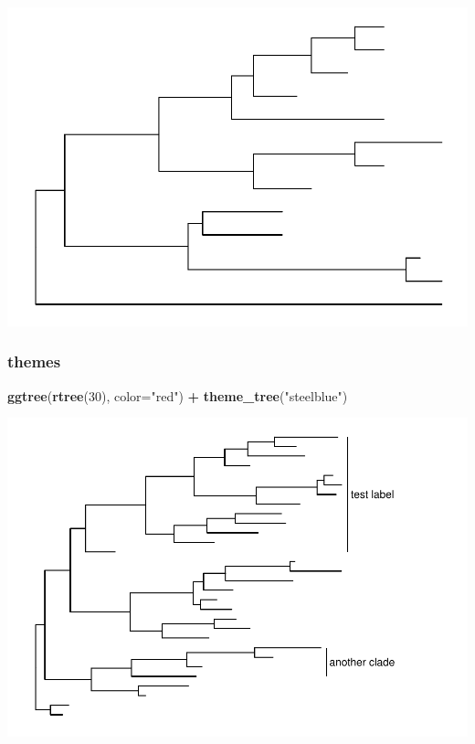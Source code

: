 \documentclass[]{article}
\newenvironment{Shaded}{\begin{snugshade}}{\end{snugshade}}
\newcommand{\KeywordTok}[1]{\textcolor[rgb]{0.13,0.29,0.53}{\textbf{#1}}}
\newcommand{\DataTypeTok}[1]{\textcolor[rgb]{0.13,0.29,0.53}{#1}}
\newcommand{\DecValTok}[1]{\textcolor[rgb]{0.00,0.00,0.81}{#1}}
\newcommand{\StringTok}[1]{\textcolor[rgb]{0.31,0.60,0.02}{#1}}
\newcommand{\OperatorTok}[1]{\textcolor[rgb]{0.81,0.36,0.00}{\textbf{#1}}}
\newcommand{\NormalTok}[1]{#1}
\begin{document}
\includegraphics{ggtree_files/figure-latex/unnamed-chunk-8-1.pdf}

\subsubsection{themes}\label{themes}

\begin{Shaded}
\begin{Highlighting}[]
\KeywordTok{ggtree}\NormalTok{(}\KeywordTok{rtree}\NormalTok{(}\DecValTok{30}\NormalTok{), }\DataTypeTok{color=}\StringTok{"red"}\NormalTok{) }\OperatorTok{+}\StringTok{ }\KeywordTok{theme_tree}\NormalTok{(}\StringTok{"steelblue"}\NormalTok{)}
\end{Highlighting}
\end{Shaded}

\includegraphics{ggtree_files/figure-latex/unnamed-chunk-9-1.pdf}
\end{document}
